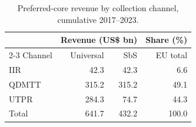 \begin{table}[H]
\centering
\small
\setlength{\tabcolsep}{4pt}
\caption[Preferred-core revenue by collection channel]{Preferred-core revenue by collection channel, cumulative 2017--2023.}
\label{tab:preferred_channel_updated}
\begin{tabular}{@{}lrrr@{}}
\toprule
 & \multicolumn{2}{c}{Revenue (US\$ bn)} & Share (\%) \\
\cmidrule(lr){2-3}
Channel & Universal & SbS & EU total \\
\midrule
IIR & 42.3 & 42.3 & 6.6 \\
QDMTT & 315.2 & 315.2 & 49.1 \\
UTPR & 284.3 & 74.7 & 44.3 \\
\midrule
Total & 641.7 & 432.2 & 100.0 \\
\bottomrule
\end{tabular}
\end{table}
